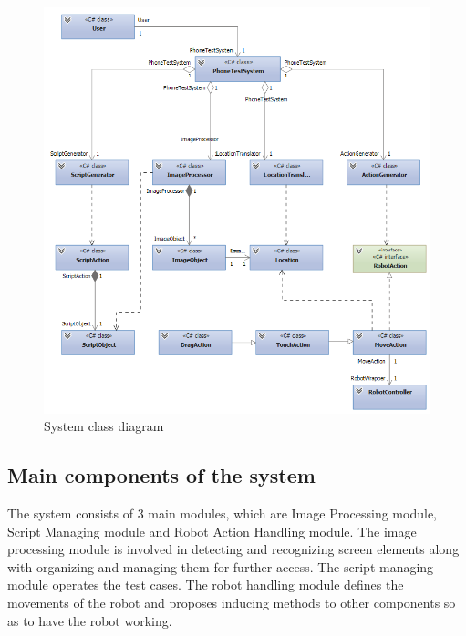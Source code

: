     \begin{figure}[H]
		\centering
		\includegraphics[scale=0.75]{Chapters/Fig/class_diagram.png}
		\caption{System class diagram}
		\label{fig:class_diagram}
	\end{figure}

\subsection{Main components of the system}
The system consists of 3 main modules, which are Image Processing module, Script Managing module and Robot Action Handling module. The image processing module is involved in detecting and recognizing screen elements along with organizing and managing them for further access. The script managing module operates the test cases. The robot handling module defines the movements of the robot and proposes inducing methods to other components so as to have the robot working.


